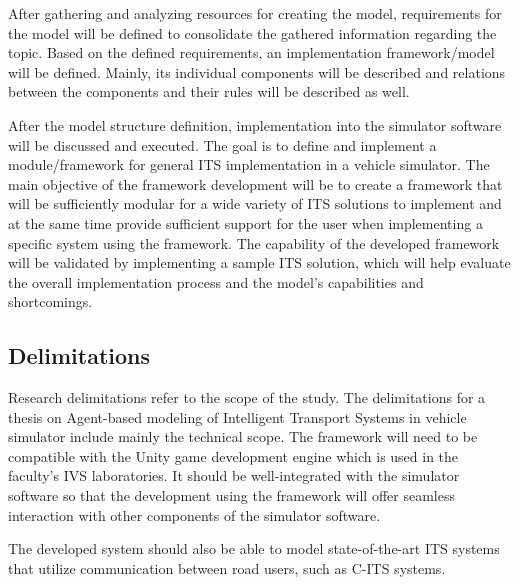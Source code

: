 \documentclass[titlepage, 12pt]{article}
\begin{document}
After gathering and analyzing resources for creating the model, requirements for the model will be defined to consolidate 
the gathered information regarding the topic. Based on the defined requirements, an implementation framework/model will be 
defined. Mainly, its individual components will be described and relations between the components and their rules will be 
described as well. 

After the model structure definition, implementation into the simulator software will be discussed and executed. 
The goal is to define and implement a module/framework for general ITS implementation in a vehicle simulator. 
The main objective of the framework development will be to create a framework that will be sufficiently modular for 
a wide variety of ITS solutions to implement and at the same time provide sufficient support for the user when 
implementing a specific system using the framework. The capability of the developed framework will be validated
by implementing a sample ITS solution, which will help evaluate the overall implementation process and the 
model's capabilities and shortcomings.

\subsection{Delimitations}

Research delimitations refer to the scope of the study. The delimitations
for a thesis on Agent-based modeling of Intelligent Transport Systems in vehicle simulator include mainly 
the technical scope. The framework will need to be compatible with the Unity game development engine which 
is used in the faculty's IVS laboratories. It should be well-integrated with the simulator software so that 
the development using the framework will offer seamless interaction with other components of the simulator software. 

The developed system should also be able to model state-of-the-art ITS systems that utilize communication between 
road users, such as C-ITS systems. 










\end{document}

